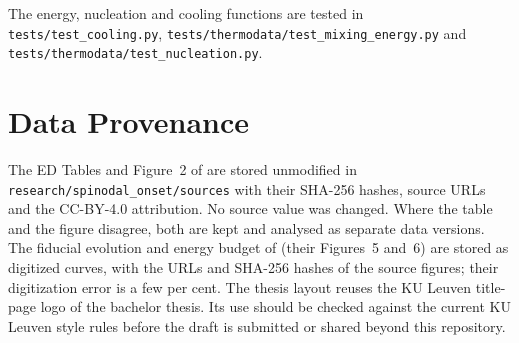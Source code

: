 The energy,
nucleation and cooling functions are tested in \texttt{tests/test\_cooling.py},
\texttt{tests/thermodata/test\_mixing\_energy.py} and
\texttt{tests/thermodata/test\_nucleation.py}.

\section{Data Provenance}

The ED Tables and Figure~2 of \cite{gilmore2026} are stored unmodified in
\texttt{research/spinodal\_onset/sources} with their SHA-256 hashes, source URLs and the
CC-BY-4.0 attribution. No source value was changed. Where the table and the figure disagree,
both are kept and analysed as separate data versions. The fiducial evolution and energy
budget of \cite{rogers2025} (their Figures~5 and~6) are stored as digitized curves, with the URLs
and SHA-256 hashes of the source figures; their digitization error is a few per cent. The thesis
layout reuses the KU Leuven
title-page logo of the bachelor thesis. Its use should be checked against the current KU Leuven
style rules before the draft is submitted or shared beyond this repository.
